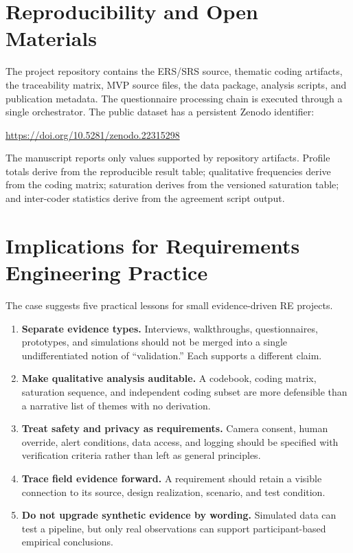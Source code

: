 \documentclass[pdflatex,sn-basic]{sn-jnl}
\begin{document}
\section{Reproducibility and Open Materials}
The project repository contains the ERS/SRS source, thematic coding artifacts, the traceability matrix, MVP source files, the data package, analysis scripts, and publication metadata. The questionnaire processing chain is executed through a single orchestrator. The public dataset has a persistent Zenodo identifier:

\begin{center}
\url{https://doi.org/10.5281/zenodo.22315298}
\end{center}

The manuscript reports only values supported by repository artifacts. Profile totals derive from the reproducible result table; qualitative frequencies derive from the coding matrix; saturation derives from the versioned saturation table; and inter-coder statistics derive from the agreement script output.

\section{Implications for Requirements Engineering Practice}
The case suggests five practical lessons for small evidence-driven RE projects.

\begin{enumerate}[leftmargin=*]
\item \textbf{Separate evidence types.} Interviews, walkthroughs, questionnaires, prototypes, and simulations should not be merged into a single undifferentiated notion of ``validation.'' Each supports a different claim.
\item \textbf{Make qualitative analysis auditable.} A codebook, coding matrix, saturation sequence, and independent coding subset are more defensible than a narrative list of themes with no derivation.
\item \textbf{Treat safety and privacy as requirements.} Camera consent, human override, alert conditions, data access, and logging should be specified with verification criteria rather than left as general principles.
\item \textbf{Trace field evidence forward.} A requirement should retain a visible connection to its source, design realization, scenario, and test condition.
\item \textbf{Do not upgrade synthetic evidence by wording.} Simulated data can test a pipeline, but only real observations can support participant-based empirical conclusions.
\end{enumerate}
\end{document}
